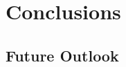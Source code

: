 \documentclass[oneside, letterpaper, 12pt, oldfontcommands]{memoir}
\begin{document}



\chapter{Conclusions}
\section{Future Outlook}
\end{document}
